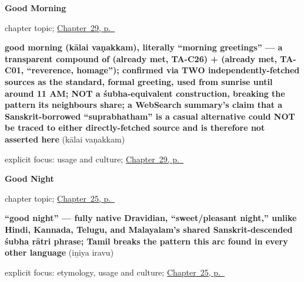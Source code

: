 \noindent\begin{minipage}[t]{\linewidth}
\raggedright
\textbf{Good Morning}\par
\footnotesize chapter topic; \hyperref[ch:ta-good-morning]{Chapter~29, p.~\pageref*{ch:ta-good-morning}}
\end{minipage}\par\smallskip

\noindent\begin{minipage}[t]{\linewidth}
\raggedright
\textbf{good morning (kālai vaṇakkam), literally \textquotedblleft{}morning greetings\textquotedblright{} — a transparent compound of  (already met, TA-C26) +  (already met, TA-C01, \textquotedblleft{}reverence, homage\textquotedblright{}); confirmed via TWO independently-fetched sources as the standard, formal greeting, used from sunrise until around 11 AM; NOT a śubha-equivalent construction, breaking the pattern its neighbours share; a WebSearch summary's claim that a Sanskrit-borrowed \textquotedblleft{}suprabhatham\textquotedblright{} is a casual alternative could NOT be traced to either directly-fetched source and is therefore not asserted here}\enspace\emph{ }\enspace(kālai vaṇakkam)\par
\footnotesize explicit focus: usage and culture; \hyperref[ch:ta-good-morning]{Chapter~29, p.~\pageref*{ch:ta-good-morning}}
\end{minipage}\par\smallskip

\noindent\begin{minipage}[t]{\linewidth}
\raggedright
\textbf{Good Night}\par
\footnotesize chapter topic; \hyperref[ch:ta-good-night]{Chapter~25, p.~\pageref*{ch:ta-good-night}}
\end{minipage}\par\smallskip

\noindent\begin{minipage}[t]{\linewidth}
\raggedright
\textbf{\textquotedblleft{}good night\textquotedblright{} — fully native Dravidian, \textquotedblleft{}sweet/pleasant night,\textquotedblright{} unlike Hindi, Kannada, Telugu, and Malayalam's shared Sanskrit-descended śubha rātri phrase; Tamil breaks the pattern this arc found in every other language}\enspace\emph{ }\enspace(iṉiya iravu)\par
\footnotesize explicit focus: etymology, usage and culture; \hyperref[ch:ta-good-night]{Chapter~25, p.~\pageref*{ch:ta-good-night}}
\end{minipage}\par\smallskip

